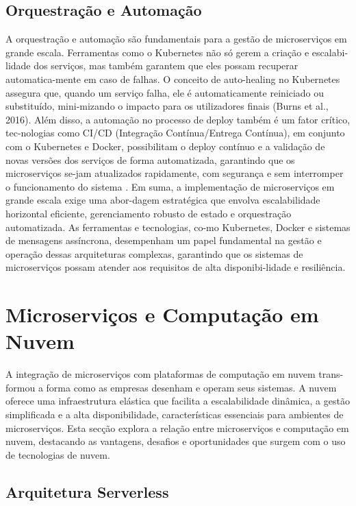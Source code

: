 \subsection{Orquestração e Automação}

A orquestração e automação são fundamentais para a gestão de microserviços em grande escala. Ferramentas como o Kubernetes não só gerem a criação e escalabi-lidade dos serviços, mas também garantem que eles possam recuperar automatica-mente em caso de falhas. O conceito de auto-healing no Kubernetes assegura que, quando um serviço falha, ele é automaticamente reiniciado ou substituído, mini-mizando o impacto para os utilizadores finais (Burns et al., 2016).
Além disso, a automação no processo de deploy também é um fator crítico, tec-nologias como CI/CD (Integração Contínua/Entrega Contínua), em conjunto com o Kubernetes e Docker, possibilitam o deploy contínuo e a validação de novas versões dos serviços de forma automatizada, garantindo que os microserviços se-jam atualizados rapidamente, com segurança e sem interromper o funcionamento do sistema \cite{Taherizadeh2020}.
Em suma, a implementação de microserviços em grande escala exige uma abor-dagem estratégica que envolva escalabilidade horizontal eficiente, gerenciamento robusto de estado e orquestração automatizada. As ferramentas e tecnologias, co-mo Kubernetes, Docker e sistemas de mensagens assíncrona, desempenham um papel fundamental na gestão e operação dessas arquiteturas complexas, garantindo que os sistemas de microserviços possam atender aos requisitos de alta disponibi-lidade e resiliência.

\section{Microserviços e Computação em Nuvem}

A integração de microserviços com plataformas de computação em nuvem trans-formou a forma como as empresas desenham e operam seus sistemas. A nuvem oferece uma infraestrutura elástica que facilita a escalabilidade dinâmica, a gestão simplificada e a alta disponibilidade, características essenciais para ambientes de microserviços. Esta secção explora a relação entre microserviços e computação em nuvem, destacando as vantagens, desafios e oportunidades que surgem com o uso de tecnologias de nuvem.

\subsection{Arquitetura Serverless}

